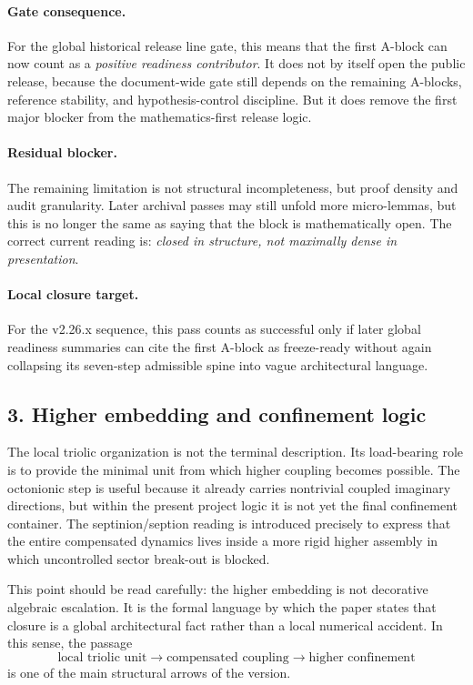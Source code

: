 \documentclass[12pt,a4paper]{article}
\DeclareRobustCommand{\QSCver}[1]{archival stage}
\renewcommand{\QSCver}[1]{historical release line}
\begin{document}
\paragraph{Gate consequence.}
For the global \QSCver{v2.27.0} gate, this means that the first A-block can now count as
a \emph{positive readiness contributor}. It does not by itself open the public
release, because the document-wide gate still depends on the remaining A-blocks,
reference stability, and hypothesis-control discipline. But it does remove the
first major blocker from the mathematics-first release logic.

\paragraph{Residual blocker.}
The remaining limitation is not structural incompleteness, but proof density and
audit granularity. Later archival passes may still unfold more micro-lemmas,
but this is no longer the same as saying that the block is mathematically open.
The correct current reading is: \emph{closed in structure, not maximally dense in
presentation}.

\paragraph{Local closure target.}
For the v2.26.x sequence, this pass counts as successful only if later global
readiness summaries can cite the first A-block as freeze-ready without again
collapsing its seven-step admissible spine into vague architectural language.

\subsection*{3. Higher embedding and confinement logic}
The local triolic organization is not the terminal description. Its load-bearing
role is to provide the minimal unit from which higher coupling becomes possible.
The octonionic step is useful because it already carries nontrivial coupled
imaginary directions, but within the present project logic it is not yet the
final confinement container. The septinion/seption reading is introduced
precisely to express that the entire compensated dynamics lives inside a more
rigid higher assembly in which uncontrolled sector break-out is blocked.

This point should be read carefully: the higher embedding is not decorative
algebraic escalation. It is the formal language by which the paper states that
closure is a global architectural fact rather than a local numerical accident.
In this sense, the passage
\[
\text{local triolic unit} \to \text{compensated coupling} \to \text{higher confinement}
\]
is one of the main structural arrows of the version.
\end{document}
